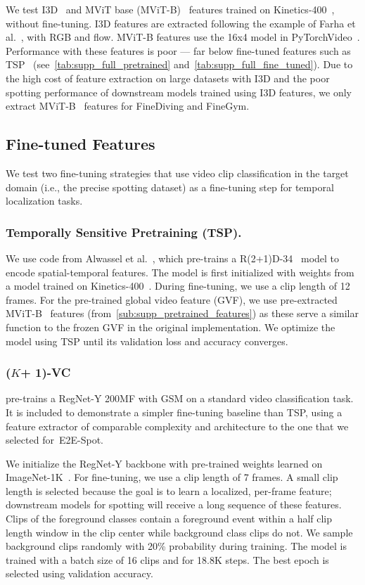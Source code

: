 \documentclass[runningheads]{llncs}
\newcommand{\notation}[1]{\ensuremath{#1}\xspace}
\newcommand{\OURMETHOD}{{E2E-Spot}\xspace}
\newcommand{\finegym}{{FineGym}\xspace}
\newcommand{\finediving}{{FineDiving}\xspace}
\newcommand{\NumClasses}{\notation{K}}
\begin{document}
We test I3D~\cite{i3d} and MViT base (MViT-B)~\cite{mvit} features trained on Kinetics-400~\cite{kinetics}, without fine-tuning.
I3D features are extracted following the example of Farha et al.~\cite{mstcn}, with RGB and flow.
MViT-B features use the 16x4 model in PyTorchVideo~\cite{pytorchvideo}.
Performance with these features is poor --- far below fine-tuned features such as TSP~\cite{tsp} (see~\autoref{tab:supp_full_pretrained} and~\ref{tab:supp_full_fine_tuned}).
Due to the high cost of feature extraction on large datasets with I3D and the poor spotting performance of downstream models trained using I3D features, we only extract MViT-B~\cite{mvit} features for \finediving and \finegym.

\subsection{Fine-tuned Features}

We test two fine-tuning strategies that use video clip classification in the target domain (i.e., the precise spotting dataset) as a fine-tuning step for temporal localization tasks.

\subsubsection*{Temporally Sensitive Pretraining (TSP).}
We use code from Alwassel et al.~\cite{tsp}, which pre-trains a R(2+1)D-34~\cite{r21d} model to encode spatial-temporal features.
The model is first initialized with weights from a model trained on Kinetics-400~\cite{kinetics}.
During fine-tuning, we use a clip length of 12 frames.
For the pre-trained global video feature (GVF), we use pre-extracted MViT-B~\cite{mvit} features (from~\autoref{sub:supp_pretrained_features}) as these serve a similar function to the frozen GVF in the original implementation.
We optimize the model using TSP until its validation loss and accuracy converges.

\subsubsection*{(\NumClasses + 1)-VC} pre-trains a RegNet-Y 200MF with GSM on a standard video classification task.
It is included to demonstrate a simpler fine-tuning baseline than TSP, using a feature extractor of comparable complexity and architecture to the one that we selected for~\OURMETHOD.

We initialize the RegNet-Y backbone with pre-trained weights learned on ImageNet-1K~\cite{imagenet}.
For fine-tuning, we use a clip length of 7 frames.
A small clip length is selected because the goal is to learn a localized, per-frame feature; downstream models for spotting will receive a long sequence of these features.
Clips of the  foreground classes contain a foreground event within a half clip length window in the clip center while background class clips do not.
We sample background clips randomly with 20\% probability during training.
The model is trained with a batch size of 16 clips and for 18.8K steps.
The best epoch is selected using validation accuracy.
\end{document}
